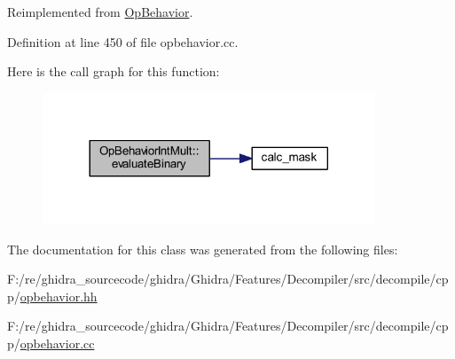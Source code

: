 Reimplemented from \mbox{\hyperlink{class_op_behavior_aeeed3af7aa35264b31a1f182884214a9}{Op\+Behavior}}.



Definition at line 450 of file opbehavior.\+cc.

Here is the call graph for this function\+:
\nopagebreak
\begin{figure}[H]
\begin{center}
\leavevmode
\includegraphics[width=281pt]{class_op_behavior_int_mult_a2a96bb858698f27cb8e65811001290f2_cgraph}
\end{center}
\end{figure}


The documentation for this class was generated from the following files\+:\begin{DoxyCompactItemize}
\item 
F\+:/re/ghidra\+\_\+sourcecode/ghidra/\+Ghidra/\+Features/\+Decompiler/src/decompile/cpp/\mbox{\hyperlink{opbehavior_8hh}{opbehavior.\+hh}}\item 
F\+:/re/ghidra\+\_\+sourcecode/ghidra/\+Ghidra/\+Features/\+Decompiler/src/decompile/cpp/\mbox{\hyperlink{opbehavior_8cc}{opbehavior.\+cc}}\end{DoxyCompactItemize}
